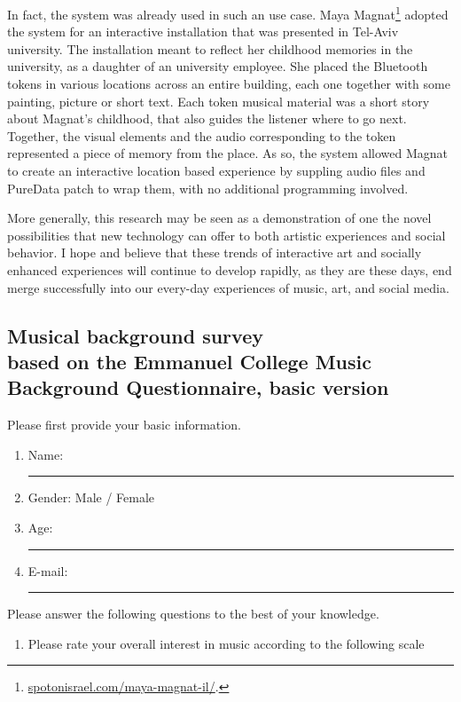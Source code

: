 \documentclass[a4paper,11pt]{article}
\newcommand{\myunderline}{\rule{2in}{.5pt}}
\begin{document}
{In fact, the system was already used in such an use case.
Maya Magnat\footnote{\href{http://spotonisrael.com/maya-magnat-il/}{spotonisrael.com/maya-magnat-il/}.} adopted the system for an interactive installation that was presented in Tel-Aviv university.
The installation meant to reflect her childhood memories in the university, as a daughter of an university employee.
She placed the Bluetooth tokens in various locations across an entire building, each one together with some painting, picture or short text.
Each token musical material was a short story about Magnat's childhood, that also guides the listener where to go next.
Together, the visual elements and the audio corresponding to the token represented a piece of memory from the place.
As so, the system allowed Magnat to create an interactive location based experience by suppling audio files and PureData patch to wrap them, with no additional programming involved.

More generally, this research may be seen as a demonstration of one the novel possibilities that new technology can offer to both artistic experiences and social behavior.
I hope and believe that these trends of interactive art and socially enhanced experiences will continue to develop rapidly, as they are these days, end merge successfully into our every-day experiences of music, art, and social media.

\begin{appendices}

\section[Musical background survey]{Musical background survey\\
	{\normalsize based on the Emmanuel College Music Background Questionnaire, basic version}}

Please first provide your basic information.

\begin{enumerate}
	\item Name: \myunderline
	\item Gender: Male / Female
	\item Age: \myunderline
	\item E-mail: \myunderline
\end{enumerate}
Please answer the following questions to the best of your knowledge.
\begin{enumerate}[resume]

	\item Please rate your overall interest in music according to the following scale


\end{enumerate}
\end{appendices}}
\end{document}
